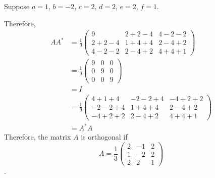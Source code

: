 \documentclass[11pt]{scrartcl}
\begin{document}
\begin{soln}
Suppose $a=1$, $b=-2$, $c=2$, $d=2$, $e = 2$, $f = 1$.

Therefore,
\begin{align}
  AA^{*} &= 
  \frac{1}{9}\begin{pmatrix}
    9 & 2 + 2 - 4 & 4 -2 -2\\
    2+2-4 & 1 + 4 +4 & 2-4+2\\
    4-2-2 & 2-4+2 & 4+4+1
  \end{pmatrix}\\
         &=
   \frac{1}{9}\begin{pmatrix}
    9 & 0 & 0\\
    0 & 9 & 0\\
    0 & 0 & 9
  \end{pmatrix}\\
         &= I\\
  &=\frac{1}{9}\begin{pmatrix}
    4+1+4 & -2 - 2 + 4 & -4 +2+2\\
    -2-2+4 & 1 + 4 +4 & 2-4+2\\
    -4+2+2 & 2-4+2 & 4+4+1
  \end{pmatrix}\\
  &= A^{*}A
\end{align}
Therefore, the matrix $A$ is orthogonal if
\begin{equation*}
  A=\frac{1}{3}
  \begin{pmatrix}
    2 & - 1 & 2\\
    1 & -2 & 2\\
    2 & 2 & 1
  \end{pmatrix}
\end{equation*}.




\end{soln}
\end{document}
